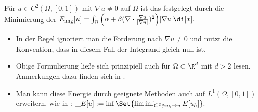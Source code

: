 \documentclass{mythesis}
\begin{document}
\begin{definition} \label{def:eemodel}
    Für $u \in C^2(\Omega, [0,1])$ mit $\nabla u \neq 0$ auf $\Omega$ ist das  festgelegt durch die Minimierung der 
    \begin{math}
	\Eimg[u] = \int_\Omega \Big(\alpha + \beta (\nabla \cdot \frac{\nabla u}{|\nabla u|})^2\Big)|\nabla u| \di[x].
    \end{math}
    \begin{note}
	\begin{itemize}
	    \item
		In der Regel ignoriert man die Forderung nach $\nabla u \neq 0$ und nutzt die Konvention, dass in diesem Fall der Integrand gleich null ist.
	    \item
		Obige Formulierung ließe sich prinzipiell auch für $\Omega \subset \R^d$ mit $d > 2$ lesen.
		Anmerkungen dazu finden sich in \cite{ambrosio2003direct}.
	    \item
		Man kann diese Energie durch geeignete Methoden auch auf $L^1(\Omega, [0,1])$ erweitern, wie in \cite{ambrosio2003direct}:
		\begin{math}
		    \_E[u] := \inf \Set{ \liminf_{C^2 \ni u_h \to u} E[u_h] }.
		\end{math}
	\end{itemize}
    \end{note}
\end{definition}
\end{document}

